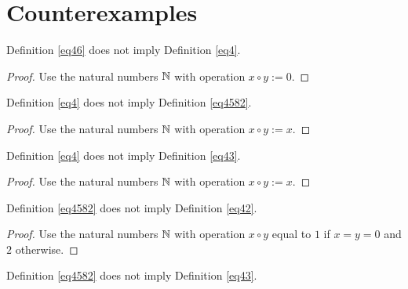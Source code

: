 \chapter{Counterexamples}

\begin{theorem}\label{46_not_imply_4}\leanok{} Definition \ref{eq46} does not imply Definition \ref{eq4}.
\end{theorem}

\begin{proof}\leanok Use the natural numbers $\mathbb{N}$ with operation $x \circ y := 0$.
\end{proof}

\begin{theorem}\label{4_not_imply_4582}\leanok{} Definition \ref{eq4} does not imply Definition \ref{eq4582}.
\end{theorem}

\begin{proof}\leanok Use the natural numbers $\mathbb{N}$ with operation $x \circ y := x$.
\end{proof}

\begin{theorem}\label{4_not_imply_43}\leanok{} Definition \ref{eq4} does not imply Definition \ref{eq43}.
\end{theorem}

\begin{proof}\leanok Use the natural numbers $\mathbb{N}$ with operation $x \circ y := x$.
\end{proof}

\begin{theorem}\label{4582_not_imply_42}\leanok{} Definition \ref{eq4582} does not imply Definition \ref{eq42}.
\end{theorem}

\begin{proof}\leanok Use the natural numbers $\mathbb{N}$ with operation
$x \circ y$ equal to $1$ if $x=y=0$ and $2$ otherwise.
\end{proof}

\begin{theorem}\label{4582_not_imply_43}\leanok{} Definition \ref{eq4582} does not imply Definition \ref{eq43}.
\end{theorem}

